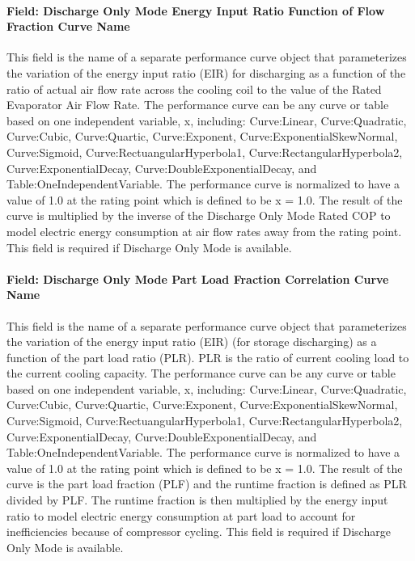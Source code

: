 \paragraph{Field: Discharge Only Mode Energy Input Ratio Function of Flow Fraction Curve Name}\label{field-discharge-only-mode-energy-input-ratio-function-of-flow-fraction-curve-name}

This field is the name of a separate performance curve object that parameterizes the variation of the energy input ratio (EIR) for discharging as a function of the ratio of actual air flow rate across the cooling coil to the value of the Rated Evaporator Air Flow Rate. The performance curve can be any curve or table based on one independent variable, x, including: Curve:Linear, Curve:Quadratic, Curve:Cubic, Curve:Quartic, Curve:Exponent, Curve:ExponentialSkewNormal, Curve:Sigmoid, Curve:RectuangularHyperbola1, Curve:RectangularHyperbola2, Curve:ExponentialDecay, Curve:DoubleExponentialDecay, and Table:OneIndependentVariable. The performance curve is normalized to have a value of 1.0 at the rating point which is defined to be x = 1.0. The result of the curve is multiplied by the inverse of the Discharge Only Mode Rated COP to model electric energy consumption at air flow rates away from the rating point. This field is required if Discharge Only Mode is available.

\paragraph{Field: Discharge Only Mode Part Load Fraction Correlation Curve Name}\label{field-discharge-only-mode-part-load-fraction-correlation-curve-name}

This field is the name of a separate performance curve object that parameterizes the variation of the energy input ratio (EIR) (for storage discharging) as a function of the part load ratio (PLR). PLR is the ratio of current cooling load to the current cooling capacity. The performance curve can be any curve or table based on one independent variable, x, including: Curve:Linear, Curve:Quadratic, Curve:Cubic, Curve:Quartic, Curve:Exponent, Curve:ExponentialSkewNormal, Curve:Sigmoid, Curve:RectuangularHyperbola1, Curve:RectangularHyperbola2, Curve:ExponentialDecay, Curve:DoubleExponentialDecay, and Table:OneIndependentVariable. The performance curve is normalized to have a value of 1.0 at the rating point which is defined to be x = 1.0. The result of the curve is the part load fraction (PLF) and the runtime fraction is defined as PLR divided by PLF. The runtime fraction is then multiplied by the energy input ratio to model electric energy consumption at part load to account for inefficiencies because of compressor cycling. This field is required if Discharge Only Mode is available.

